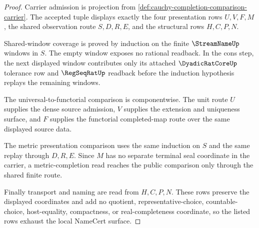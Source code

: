 \begin{proof}
Carrier admission is projection from \autoref{def:cauchy-completion-comparison-carrier}. The accepted tuple displays exactly the four presentation rows $U,V,F,M$, the shared observation route $S,D,R,E$, and the structural rows $H,C,P,N$.

Shared-window coverage is proved by induction on the finite $\StreamNameUp$ windows in $S$. The empty window exposes no rational readback. In the cons step, the next displayed window contributes only its attached $\DyadicRatCoreUp$ tolerance row and $\RegSeqRatUp$ readback before the induction hypothesis replays the remaining windows.

The universal-to-functorial comparison is componentwise. The unit route $U$ supplies the dense source admission, $V$ supplies the extension and uniqueness surface, and $F$ supplies the functorial completed-map route over the same displayed source data.

The metric presentation comparison uses the same induction on $S$ and the same replay through $D,R,E$. Since $M$ has no separate terminal seal coordinate in the carrier, a metric-completion read reaches the public comparison only through the shared finite route.

Finally transport and naming are read from $H,C,P,N$. These rows preserve the displayed coordinates and add no quotient, representative-choice, countable-choice, host-equality, compactness, or real-completeness coordinate, so the listed rows exhaust the local NameCert surface.
\end{proof}

